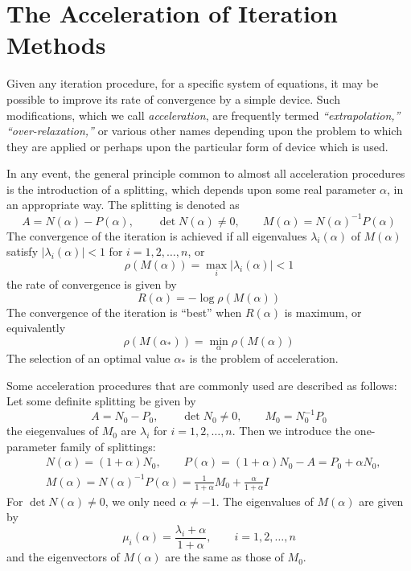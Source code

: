 \documentclass[../main.tex]{subfiles}
\begin{document}
\section{The Acceleration of Iteration Methods}
Given any iteration procedure, for a specific system of equations, it may be possible to improve its rate of convergence by a simple device. Such modifications, which we call \emph{acceleration}, are frequently termed \emph{``extrapolation,'' ``over-relaxation,''} or various other names depending upon the problem to which they are applied or perhaps upon the particular form of device which is used.

In any event, the general principle common to almost all acceleration procedures is the introduction of a splitting, which depends upon some real parameter $\alpha$, in an appropriate way. The splitting is denoted as
\begin{equation}
	A = N(\alpha) - P(\alpha), \qquad \det N(\alpha) \neq 0, \qquad M(\alpha) = N(\alpha)^{-1} P(\alpha)
\end{equation}
The convergence of the iteration is achieved if all eigenvalues $\lambda_i(\alpha)$ of $M(\alpha)$ satisfy $|\lambda_i(\alpha)| < 1$ for $i = 1, 2, \ldots, n$, or
\begin{equation*}
	\rho(M(\alpha)) = \max_i |\lambda_i(\alpha)| < 1
\end{equation*}
the rate of convergence is given by
\begin{equation*}
	R(\alpha) = - \log \rho(M(\alpha))
\end{equation*}
The convergence of the iteration is ``best'' when $R(\alpha)$ is maximum, or equivalently
\begin{equation}\label{eq:acceleration-optimal-alpha}
	\rho(M(\alpha_*)) = \min_{\alpha} \rho(M(\alpha))
\end{equation}
The selection of an optimal value $\alpha_*$ is the problem of acceleration.

Some acceleration procedures that are commonly used are described as follows: Let some definite splitting be given by
\begin{equation*}
	A = N_0 - P_0, \qquad \det N_0 \neq 0, \qquad M_0 = N_0^{-1} P_0
\end{equation*}
the eiegenvalues of $M_0$ are $\lambda_i$ for $i = 1, 2, \ldots, n$. Then we introduce the one-parameter family of splittings:
\begin{equation}\label{eq:acceleration-scheme}
	\begin{aligned}
		 & N(\alpha) = (1 + \alpha) N_0, \qquad P(\alpha) = (1 + \alpha) N_0 - A = P_0 + \alpha N_0,     \\
		 & M(\alpha) = N(\alpha)^{-1} P(\alpha) = \frac{1}{1 + \alpha} M_0 + \frac{\alpha}{1 + \alpha} I
	\end{aligned}
\end{equation}
For $\det N(\alpha) \neq 0$, we only need $\alpha \neq -1$. The eigenvalues of $M(\alpha)$ are given by
\begin{equation}\label{eq:acceleration-eigenvalues}
	\mu_i(\alpha) = \frac{\lambda_i + \alpha}{1 + \alpha}, \qquad i = 1, 2, \ldots, n
\end{equation}
and the eigenvectors of $M(\alpha)$ are the same as those of $M_0$.
\end{document}
